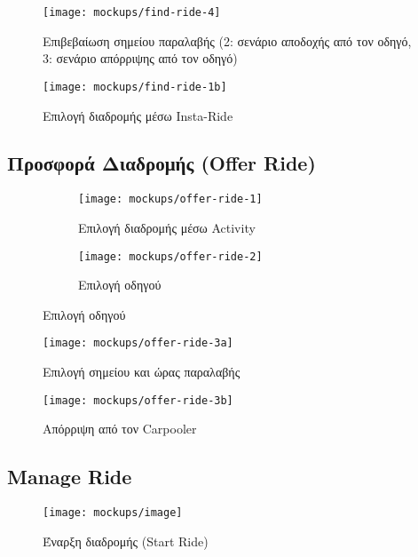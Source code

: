 \begin{figure}[H]
    \centering
    \texttt{[image: mockups/find-ride-4]}
    \caption{Επιβεβαίωση σημείου παραλαβής (2: σενάριο αποδοχής από τον οδηγό, 3: σενάριο απόρριψης από τον οδηγό)}
\end{figure}

\newpage

\begin{figure}[H]
    \centering
    \texttt{[image: mockups/find-ride-1b]}
    \caption{Επιλογή διαδρομής μέσω Insta-Ride}
\end{figure}

\newpage

\subsection{Προσφορά Διαδρομής (Offer Ride)}

\begin{figure}[H]
    \centering
    \begin{subfigure}[b]{0.3\textwidth}
        \texttt{[image: mockups/offer-ride-1]}
        \caption{Επιλογή διαδρομής μέσω Activity}
    \end{subfigure}
    \hfill
    \begin{subfigure}[b]{0.3\textwidth}
        \texttt{[image: mockups/offer-ride-2]}
        \caption{Επιλογή οδηγού}
    \end{subfigure}
\end{figure}

\begin{figure}[H]
    \texttt{[image: mockups/offer-ride-3a]}
    \caption{Επιλογή σημείου και ώρας παραλαβής}
\end{figure}

\newpage

\begin{figure}[h!]
    \texttt{[image: mockups/offer-ride-3b]}
    \caption{Απόρριψη από τον Carpooler}
\end{figure}

\newpage

\subsection{Manage Ride}

\begin{figure}[H]
    \texttt{[image: mockups/image]}
    \caption{Έναρξη διαδρομής (Start Ride)}
\end{figure}

